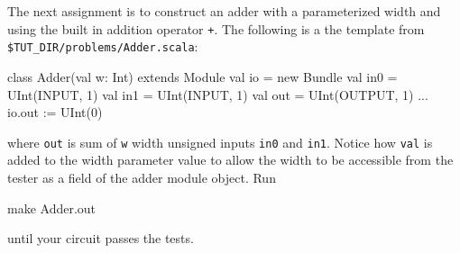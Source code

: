 The next assignment is to construct an adder with a parameterized width and using the built in addition operator \verb!+!.
The following is a the template from \verb+$TUT_DIR/problems/Adder.scala+:

\begin{scala}
class Adder(val w: Int) extends Module {
  val io = new Bundle {
    val in0 = UInt(INPUT,  1)
    val in1 = UInt(INPUT,  1)
    val out = UInt(OUTPUT, 1)
  }
  ...
  io.out := UInt(0)
}
\end{scala}

\noindent
where \verb+out+ is sum of \verb+w+ width unsigned inputs \verb+in0+ and \verb+in1+.  
Notice how \verb+val+ is added to the width parameter value to 
allow the width to be accessible from the tester as a field of the adder module object.  Run 

\begin{bash}
make Adder.out
\end{bash}

\noindent 
until your circuit passes the tests.


%
%


%
%
%

